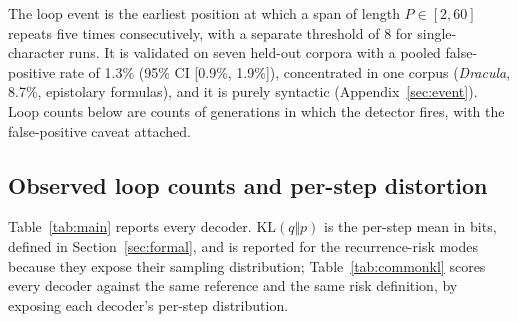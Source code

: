 \documentclass[11pt]{article}
\newcommand{\KL}{\mathrm{KL}}
\begin{document}
The loop event is the earliest position at which a span of length $P\in[2,60]$ repeats five times consecutively, with a separate threshold of 8 for single-character runs. It is validated on seven held-out corpora with a pooled false-positive rate of 1.3\% (95\% CI [0.9\%, 1.9\%]), concentrated in one corpus (\emph{Dracula}, 8.7\%, epistolary formulas), and it is purely syntactic (Appendix~\ref{sec:event}). Loop counts below are counts of generations in which the detector fires, with the false-positive caveat attached.

\subsection{Observed loop counts and per-step distortion}
\label{sec:results}
\label{ssec:common-kl}
Table~\ref{tab:main} reports every decoder. $\KL(q\Vert p)$ is the per-step mean in bits, defined in Section~\ref{sec:formal}, and is reported for the recurrence-risk modes because they expose their sampling distribution; Table~\ref{tab:commonkl} scores every decoder against the same reference and the same risk definition, by exposing each decoder's per-step distribution.
\end{document}
